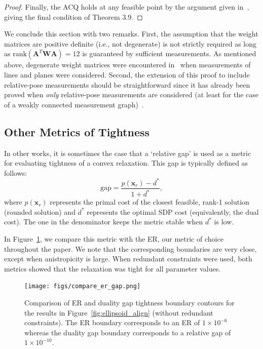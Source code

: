 \documentclass[lettersize,journal]{IEEEtran}
\newcommand{\rank}[1]{\mbox{rank}\left(#1\right)}
\begin{document}
\begin{proof}
Finally, the ACQ holds at any feasible point by the argument given in~\cite{cifuentesLocalStabilitySemidefinite2022}, giving the final condition of Theorem 3.9.
\end{proof}

We conclude this section with two remarks. First, the assumption that the weight matrices are positive definite (i.e., not degenerate) is not strictly required as long as $\rank{\bm{A}^T \bm{W} \bm{A}}=12$ is guaranteed by sufficient measurements. As mentioned above, degenerate weight matrices were encountered in~\cite{brialesConvexGlobal3D2017} when measurements of lines and planes were considered. Second, the extension of this proof to include relative-pose measurements should be straightforward since it has already been proved when \emph{only} relative-pose measurements are considered (at least for the case of a weakly connected measurement graph)~\cite{rosenSESyncCertifiablyCorrect2019}.

% 

\subsection{Other Metrics of Tightness}\label{App:otherMetrics}

In other works, it is sometimes the case that a `relative gap' is used as a metric for evaluating tightness of a convex relaxation. This gap is typically defined as follows:
\begin{equation*}
	\mbox{gap} = \frac{p(\bm{x}_r)-d^*}{1+d^*},
\end{equation*}
where $p(\bm{x}_r)$ represents the primal cost of the closest feasible, rank-1 solution (rounded solution) and $d^*$ represents the optimal SDP cost (equivalently, the dual cost). The one in the denominator keeps the metric stable when $d^*$ is low. 

In Figure~\ref{fig:compare_er_gap}, we compare this metric with the ER, our metric of choice throughout the paper. We note that the corresponding boundaries are very close, except when anistropicity is large. When redundant constraints were used, both metrics showed that the relaxation was tight for all parameter values.

\begin{figure}[!ht]
	\centering
	\texttt{[image: figs/compare\_er\_gap.png]}
	\caption{Comparison of ER and duality gap tightness boundary contours for the results in Figure~\ref{fig:ellipsoid_align} (without redundant constraints). The ER boundary corresponds to an ER of $1\times10^{-6}$ whereas the duality gap boundary corresponds to a relative gap of $1\times10^{-10}$.}
	\label{fig:compare_er_gap}
\end{figure}
\end{document}
